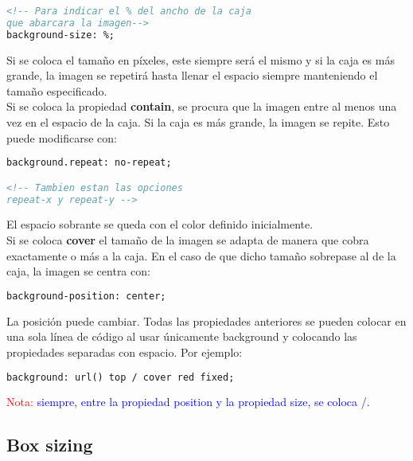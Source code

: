 \documentclass[10pt,oneside]{article}
\begin{document}
\begin{multicols}{2}
\begin{itemize}
\begin{lstlisting}[language=HTML]
<!-- Para indicar el % del ancho de la caja
que abarcara la imagen-->
background-size: %;
        \end{lstlisting}

        Si se coloca el tamaño en píxeles, este siempre será el mismo y si la caja es más grande, la imagen se repetirá hasta llenar el espacio siempre manteniendo el tamaño especificado. \\ \newline Si se coloca la propiedad \textbf{contain}, se procura que la imagen entre al menos una vez en el espacio de la caja. Si la caja es más grande, la imagen se repite. Esto puede modificarse con: 
        
        \begin{lstlisting}[language=HTML]
background.repeat: no-repeat; 

<!-- Tambien estan las opciones
repeat-x y repeat-y -->
        \end{lstlisting}   

        El espacio sobrante se queda con el color definido inicialmente.\\ \newline Si se coloca \textbf{cover} el tamaño de la imagen se adapta de manera que cobra exactamente o más a la caja. En el caso de que dicho tamaño sobrepase al de la caja, la imagen se centra con:  

        \begin{lstlisting}[language=HTML]
background-position: center;
        \end{lstlisting}

        La posición puede cambiar. Todas las propiedades anteriores se pueden colocar en una sola línea de código al usar únicamente background y colocando las propiedades separadas con espacio. Por ejemplo:
        
        \begin{lstlisting}[language=HTML]
background: url() top / cover red fixed;
        \end{lstlisting}

        \textcolor{red}{Nota:} \textcolor{blue}{siempre, entre la propiedad position y la propiedad size, se coloca /.}
        
    \end{itemize} 


\subsection{Box sizing}    


\end{multicols}
\end{document}
